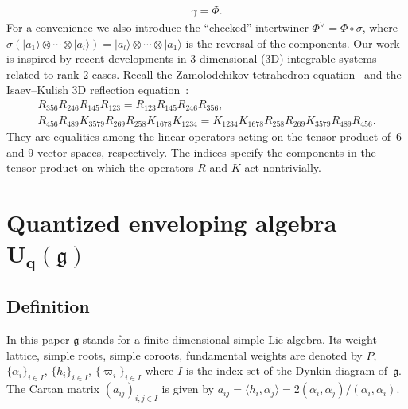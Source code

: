 \documentclass[11pt]{article}
\newcommand{\geh}{\mathfrak{g}}
\newcommand{\pair}[1]{\langle{#1}\rangle}
\begin{document}
\begin{gather}\label{a:main}
\gamma= \Phi.
\end{gather}
For a convenience we also introduce the ``checked'' intertwiner
$\Phi^{\vee} = \Phi \circ \sigma$, where
$\sigma  (|a_1\rangle \otimes \cdots \otimes |a_l\rangle) =
 |a_l\rangle \otimes \cdots \otimes |a_1 \rangle$
is the reversal of the components.
\setcounter{section}{1}
\setcounter{subsection}{0}
\setcounter{subsubsection}{0}
\setcounter{equation}{1}
Our work is inspired by recent developments in
3-dimensional (3D) integrable systems related to
rank 2 cases.
Recall the Zamolodchikov tetrahedron equation~\cite{Zam80}
and the Isaev--Kulish 3D ref\/lection equation~\cite{IK}:
\begin{gather}
{R}_{356}{R}_{246}{R}_{145}{R}_{123}
={R}_{123}{R}_{145}{R}_{246}{R}_{356}, \label{a:teq}\\
{R}_{456}{R}_{489}
{K}_{3579}{R}_{269}{R}_{258}
{K}_{1678}{K}_{1234}
={K}_{1234}
{K}_{1678}
{R}_{258}{R}_{269}
{K}_{3579}{R}_{489}{R}_{456}.\label{a:3dref}
\end{gather}
They are equalities among the linear operators acting on the
tensor product of~6 and 9 vector spaces, respectively.
The indices specify the components in the tensor product
on which the operators $R$ and $K$ act nontrivially.
\setcounter{section}{1}
\setcounter{subsection}{0}
\setcounter{subsubsection}{0}
\setcounter{equation}{3}
\section[Quantized enveloping algebra $U_q(\geh)$]{Quantized enveloping algebra $\boldsymbol{U_q(\geh)}$}\label{a:sec2}

\subsection{Def\/inition}

In this paper $\geh$ stands for a f\/inite-dimensional simple Lie algebra.
Its weight lattice, simple roots, simple coroots, fundamental weights are
denoted by $P$, $\{\alpha_i\}_{i\in I}$, $\{h_i\}_{i\in I}$, $\{\varpi_i\}_{i\in I}$
where $I$ is the index set of the Dynkin diagram of~$\geh$.
The Cartan matrix $(a_{ij})_{i,j\in I}$ is given by
$a_{ij}=\pair{h_i,\alpha_j}=2(\alpha_i, \alpha_j)/(\alpha_i,\alpha_i)$.
\end{document}
